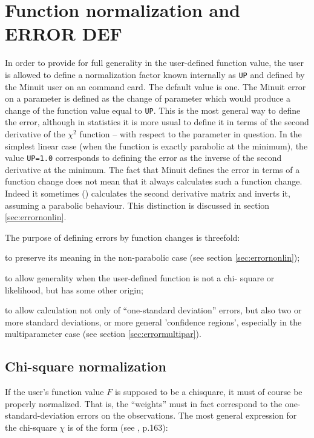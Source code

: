 \section{Function normalization and ERROR DEF}
 
In order to provide for full generality in the user-defined function
value, the user is allowed to define a normalization factor known
internally as \texttt{UP} and defined by the Minuit user on an
 command card.  The default value is
one. The Minuit error on a parameter is defined as the change of
parameter which would produce a change of the function value equal to
\texttt{UP}.  This is the most general way to define the error,
although in statistics it is more usual to define it in terms of the
second derivative of the $\chi^2$ function -- with respect to the
parameter in question. In the simplest linear case (when the function
is exactly parabolic at the minimum), the value \texttt{UP=1.0}
corresponds to defining the error as the inverse of the second
derivative at the minimum. The fact that Minuit defines the error in
terms of a function change does not mean that it always calculates
such a function change. Indeed it sometimes ()
calculates the second derivative matrix and inverts it, assuming a
parabolic behaviour. This distinction is discussed in section
\ref{sec:errornonlin}.
 
The purpose of defining errors by function changes is threefold: 

\begin{OL}
\item to preserve its meaning in the non-parabolic case (see section
  \ref{sec:errornonlin});
\item to allow generality when the user-defined function is not a chi-
  square or likelihood, but has some other origin;
\item to allow calculation not only of ``one-standard deviation''
  errors, but also two or more standard deviations, or more general
  'confidence regions', especially in the multiparameter case (see
  section \ref{sec:errormultipar}).
\end{OL}
 
\subsection{Chi-square normalization}
 
If the user's function value $F$ is supposed to be a chisquare, it must 
of course be properly normalized. That is, the ``weights'' must in fact 
correspond to the one-standard-deviation errors on the observations. 
The most general expression for the chi-square $\chi$ is of 
the form (see \cite{bib-EADIE}, p.163):
 
